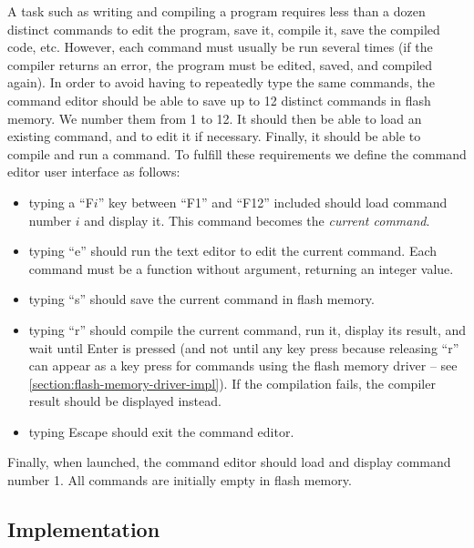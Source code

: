 A task such as writing and compiling a program requires less than a dozen
distinct commands to edit the program, save it, compile it, save the compiled
code, etc. However, each command must usually be run several times (if the
compiler returns an error, the program must be edited, saved, and compiled
again). In order to avoid having to repeatedly type the same commands, the
command editor should be able to save up to 12 distinct commands in flash
memory. We number them from 1 to 12. It should then be able to load an existing
command, and to edit it if necessary. Finally, it should be able to compile and
run a command. To fulfill these requirements we define the command editor user
interface as follows:
\begin{itemize}
  \item typing a ``F$i$'' key between ``F1'' and ``F12'' included should load
  command number $i$ and display it. This command becomes the {\em current
  command}.

  \item typing ``e'' should run the text editor to edit the current command.
  Each command must be a function without argument, returning an integer value.

  \item typing ``s'' should save the current command in flash memory.

  \item typing ``r'' should compile the current command, run it, display its
  result, and wait until Enter is pressed (and not until any key press
  because releasing ``r'' can appear as a key press for commands using the
  flash memory driver -- see \cref{section:flash-memory-driver-impl}). If the
  compilation fails, the compiler result should be displayed instead.

  \item typing Escape should exit the command editor.
\end{itemize}

Finally, when launched, the command editor should load and display command
number 1. All commands are initially empty in flash memory.

\subsection{Implementation}\label{subsection:command-editor-implementation}

